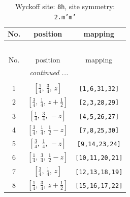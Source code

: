 \documentclass[fleqn,8pt]{jsarticle}
\begin{document}
\begin{longtable}{ccc}
\caption{Wyckoff site: {\tt 8h}, site symmetry: {\tt 2.m'm'}}
 \\
 \hline \hline
No. & position & mapping \\ \hline \endfirsthead

\multicolumn{2}{l}{\tablename\ \thetable{}} \\
 \hline \hline
No. & position & mapping \\ \hline \endhead

 \hline \hline
\multicolumn{2}{r}{\footnotesize\it continued ...} \\ \endfoot

 \hline \hline
\multicolumn{2}{r}{} \\ \endlastfoot

1 & $\left[ \frac{1}{4},\, \frac{3}{4},\, z \right]$ & {\tt [1,6,31,32]} \\ \hline
2 & $\left[ \frac{3}{4},\, \frac{1}{4},\, z + \frac{1}{2} \right]$ & {\tt [2,3,28,29]} \\ \hline
3 & $\left[ \frac{1}{4},\, \frac{3}{4},\, - z \right]$ & {\tt [4,5,26,27]} \\ \hline
4 & $\left[ \frac{3}{4},\, \frac{1}{4},\, \frac{1}{2} - z \right]$ & {\tt [7,8,25,30]} \\ \hline
5 & $\left[ \frac{3}{4},\, \frac{1}{4},\, - z \right]$ & {\tt [9,14,23,24]} \\ \hline
6 & $\left[ \frac{1}{4},\, \frac{3}{4},\, \frac{1}{2} - z \right]$ & {\tt [10,11,20,21]} \\ \hline
7 & $\left[ \frac{3}{4},\, \frac{1}{4},\, z \right]$ & {\tt [12,13,18,19]} \\ \hline
8 & $\left[ \frac{1}{4},\, \frac{3}{4},\, z + \frac{1}{2} \right]$ & {\tt [15,16,17,22]} \\
\end{longtable}
\renewcommand{\arraystretch}{1.2}
\end{document}
